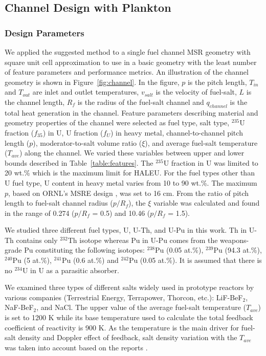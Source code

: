 \subsection{Channel Design with Plankton}

\subsubsection{Design Parameters}

    We applied the suggested method to a single fuel channel \gls{MSR} geometry with square unit cell approximation to use in a basic geometry with the least number of feature parameters and performance metrics. An illustration of the channel geometry is shown in Figure~\ref{fig:channel}. In the figure, $p$ is the pitch length, $T_{in}$ and $T_{out}$ are inlet and outlet temperatures, $v_{salt}$ is the velocity of fuel-salt, $L$ is the channel length, $R_f$ is the radius of the fuel-salt channel and $q_{channel}$ is the total heat generation in the channel. Feature parameters describing material and geometry properties of the channel were selected as fuel type, salt type, $^{235}$U fraction ($f_{35}$) in U, U fraction ($f_{U}$) in heavy metal, channel-to-channel pitch length ($p$), moderator-to-salt volume ratio ($\xi$), and average fuel-salt temperature ($T_{ave}$) along the channel. We varied these variables between upper and lower bounds described in Table~\ref{table:features}. The $^{235}$U fraction in U was limited to 20 wt.\% which is the maximum limit for \gls{HALEU}. For the fuel types other than U fuel type, U content in heavy metal varies from 10 to 90 wt.\%. The maximum $p$, based on \gls{ORNL}'s \gls{MSRE} design \cite{robertson1971}, was set to 16 cm. From the ratio of pitch length to fuel-salt channel radius ($p/R_{f}$), the $\xi$ variable was calculated and found in the range of 0.274 ($p/R_{f}$ = 0.5) and 10.46 ($p/R_{f}$ = 1.5).

    We studied three different fuel types, U, U-Th, and U-Pu in this work. Th in U-Th contains only $^{232}$Th isotope whereas Pu in U-Pu comes from the weapons-grade Pu constituting the following isotopes: $^{238}$Pu (0.05 at.\%), $^{239}$Pu (94.3 at.\%), $^{240}$Pu (5 at.\%), $^{241}$Pu (0.6 at.\%) and $^{242}$Pu (0.05 at.\%). It is assumed that there is no $^{234}$U in U as a parasitic absorber.

    We examined three types of different salts widely used in prototype reactors by various companies (Terrestrial Energy, Terrapower, Thorcon, etc.): LiF-BeF$_2$, NaF-BeF$_2$, and NaCl. The upper value of the average fuel-salt temperature ($T_{ave}$) is set to 1200 K while its base temperature used to calculate the total feedback coefficient of reactivity is 900 K. As the temperature is the main driver for fuel-salt density and Doppler effect of feedback, salt density variation with the $T_{ave}$ was taken into account based on the reports \cite{Janz1988, Jerden2019}.

